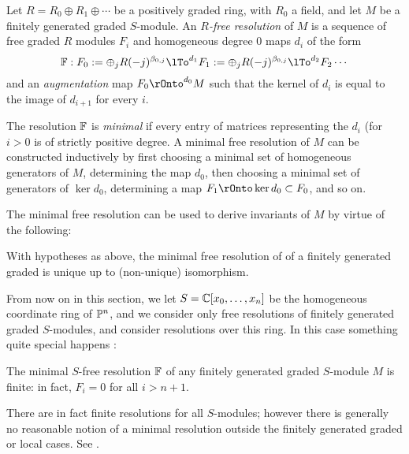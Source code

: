 Let 
$R = R_{0} \oplus R_{1}\oplus\cdots$ be a positively graded ring, with $R_{0}$ a field,
 and let $M$ be a finitely generated graded $S$-module. An  \emph{$R$-free resolution} of $M$ is a sequence of free graded $R$ modules $F_{i}$ and homogeneous degree 0 maps $d_{i}$ of the form
$$
\FF: F_{0}:=\oplus_{j}R(-j)^{\beta_{0,j}} \lTo^{d_{1}} F_{1}:=\oplus_{j}R(-j)^{\beta_{0,j}}\lTo^{d_{2}} F_{2}\cdots
$$
and an \emph{augmentation} map $F_{0} \rOnto^{d_{0}} M$ such that the kernel of $d_{i}$ is equal to the image of $d_{i+1}$ for every $i$. 

The resolution $\FF$ is \emph{minimal} if every entry of matrices representing the $d_{i}$ (for $i>0$ is of strictly positive degree. A minimal free resolution of $M$ can be constructed inductively by first choosing a minimal set of homogeneous generators of $M$, determining the map $d_{0}$, then choosing a minimal set of generators of $\ker d_{0}$, determining a map
$F_{1} \rOnto \ker d_{0} \subset F_{0}$, and so on.

The minimal free resolution can be used to derive invariants of $M$
\cite[Theorem ***]{E} by virtue of the following:

\begin{theorem}[Uniqueness]\label{uniqueness} With hypotheses as above, the minimal free resolution of of a finitely generated graded is unique up to (non-unique) isomorphism.
\end{theorem}

From now on in this section, we let $S = \CC[x_{0},\dots, x_{n}]$ be the homogeneous coordinate ring of $\PP^{n}$, and we consider only free resolutions of finitely generated graded $S$-modules, and consider resolutions over this ring. In this case something quite special happens \cite[****]{E}:

\begin{theorem}\label{hst}
The minimal $S$-free resolution $\FF$ of any finitely generated graded $S$-module $M$ is finite: in fact, $F_{i}=0$ for all $i>n+1$.
\end{theorem}

\begin{fact}
 There are in fact finite resolutions for all $S$-modules; however there is generally no reasonable notion of a  minimal resolution outside the finitely generated graded or local cases. See \cite{???}.
\end{fact}

